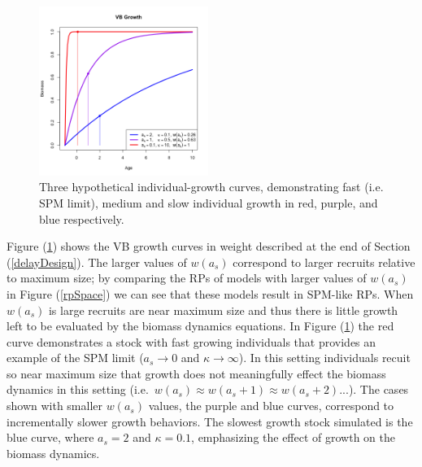
\begin{figure}
\vspace{-1.5cm}
\includegraphics[width=0.49\textwidth]{../ddBias/vbCurves.png}
\caption{Three hypothetical individual-growth curves, demonstrating 
fast (i.e. SPM limit), medium and slow individual growth in red, 
purple, and blue respectively.
\label{vbCurves}}
\end{figure}
%
Figure (\ref{vbCurves}) shows the VB growth curves in weight
described at the end of Section (\ref{delayDesign}). %
The larger values of $w(a_s)$ correspond to larger recruits relative 
to maximum size; by comparing the RPs of models with larger values of 
$w(a_s)$ in Figure (\ref{rpSpace}) we can see that these models result in SPM-like RPs.
When $w(a_s)$ is large recruits are near maximum size and thus there is little growth left 
to be evaluated by the biomass dynamics equations. In Figure (\ref{vbCurves}) the red curve 
demonstrates a stock with fast growing individuals that provides an example of the SPM limit 
($a_s\rightarrow0$ and $\kappa\rightarrow\infty$). In this setting individuals recuit so near maximum size that 
growth does not meaningfully effect the biomass dynamics in this setting \mbox{(i.e. $w(a_s)\approx w(a_s+1)\approx w(a_s+2)...$).}
The cases shown with smaller $w(a_s)$ values, the purple and blue curves, correspond to 
incrementally slower growth behaviors. The slowest growth stock simulated is the blue curve, 
where $a_s=2$ and $\kappa=0.1$, emphasizing the effect of growth on the biomass dynamics. 

